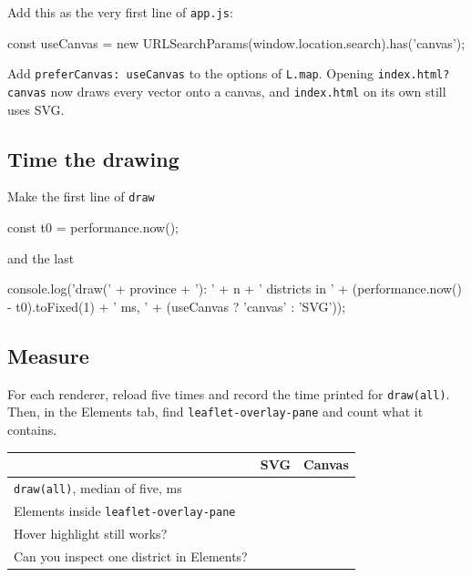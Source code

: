 \documentclass{article}
\newcommand{\cd}[1]{\texttt{#1}}
\begin{document}
Add this as the very first line of \cd{app.js}:

\begin{code}
const useCanvas = new URLSearchParams(window.location.search).has('canvas');
\end{code}

Add \cd{preferCanvas: useCanvas} to the options of \cd{L.map}. Opening
\cd{index.html?canvas} now draws every vector onto a canvas, and
\cd{index.html} on its own still uses SVG.

\subsection{Time the drawing}

Make the first line of \cd{draw}

\begin{code}
  const t0 = performance.now();
\end{code}

and the last

\begin{code}
  console.log('draw(' + province + '): ' + n + ' districts in ' +
              (performance.now() - t0).toFixed(1) + ' ms, ' +
              (useCanvas ? 'canvas' : 'SVG'));
\end{code}

\subsection{Measure}

For each renderer, reload five times and record the time printed for
\cd{draw(all)}. Then, in the Elements tab, find \cd{leaflet-overlay-pane}
and count what it contains.

\vspace{.6em}
\begin{tabularx}{\textwidth}{@{}X r r@{}}
\toprule
 & \textbf{SVG} & \textbf{Canvas} \\
\midrule
\cd{draw(all)}, median of five, ms & \hspace{2cm} & \hspace{2cm} \\
Elements inside \cd{leaflet-overlay-pane} & & \\
Hover highlight still works? & & \\
Can you inspect one district in Elements? & & \\
\bottomrule
\end{tabularx}
\end{document}
